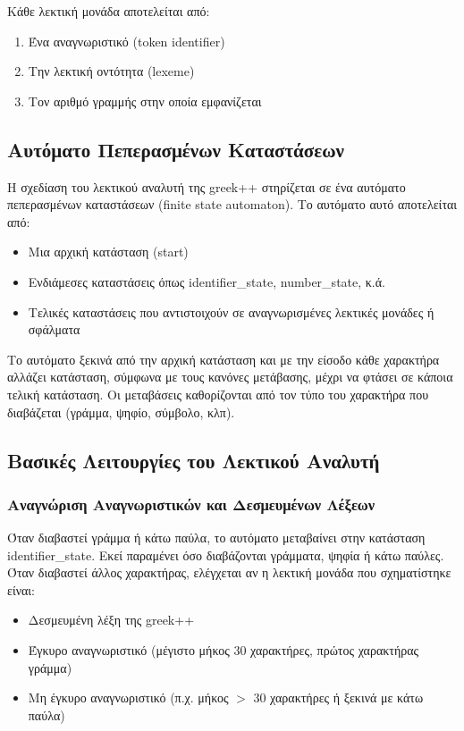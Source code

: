 \documentclass[12pt,a4paper]{article}
\begin{document}
            Κάθε λεκτική μονάδα αποτελείται από:
            \begin{enumerate}
                \item Ένα αναγνωριστικό (token identifier)
                \item Την λεκτική οντότητα (lexeme)
                \item Τον αριθμό γραμμής στην οποία εμφανίζεται
            \end{enumerate}

        \subsection{Αυτόματο Πεπερασμένων Καταστάσεων}
            Η σχεδίαση του λεκτικού αναλυτή της greek++ στηρίζεται σε ένα αυτόματο πεπερασμένων καταστάσεων (finite state automaton). Το αυτόματο αυτό αποτελείται από:

            \begin{itemize}
                \item Μια αρχική κατάσταση (start)
                \item Ενδιάμεσες καταστάσεις όπως identifier\_state, number\_state, κ.ά.
                \item Τελικές καταστάσεις που αντιστοιχούν σε αναγνωρισμένες λεκτικές μονάδες ή σφάλματα
            \end{itemize}

            Το αυτόματο ξεκινά από την αρχική κατάσταση και με την είσοδο κάθε χαρακτήρα αλλάζει κατάσταση, σύμφωνα με τους κανόνες μετάβασης, μέχρι να φτάσει σε κάποια τελική κατάσταση. Οι μεταβάσεις καθορίζονται από τον τύπο του χαρακτήρα που διαβάζεται (γράμμα, ψηφίο, σύμβολο, κλπ).

        \subsection{Βασικές Λειτουργίες του Λεκτικού Αναλυτή}

            \subsubsection{Αναγνώριση Αναγνωριστικών και Δεσμευμένων Λέξεων}
                Όταν διαβαστεί γράμμα ή κάτω παύλα, το αυτόματο μεταβαίνει στην κατάσταση identifier\_state. Εκεί παραμένει όσο διαβάζονται γράμματα, ψηφία ή κάτω παύλες. Όταν διαβαστεί άλλος χαρακτήρας, ελέγχεται αν η λεκτική μονάδα που σχηματίστηκε είναι:
                \begin{itemize}
                    \item Δεσμευμένη λέξη της greek++
                    \item Έγκυρο αναγνωριστικό (μέγιστο μήκος 30 χαρακτήρες, πρώτος χαρακτήρας γράμμα)
                    \item Μη έγκυρο αναγνωριστικό (π.χ. μήκος $>$ 30 χαρακτήρες ή ξεκινά με κάτω παύλα)
                \end{itemize}
\end{document}
